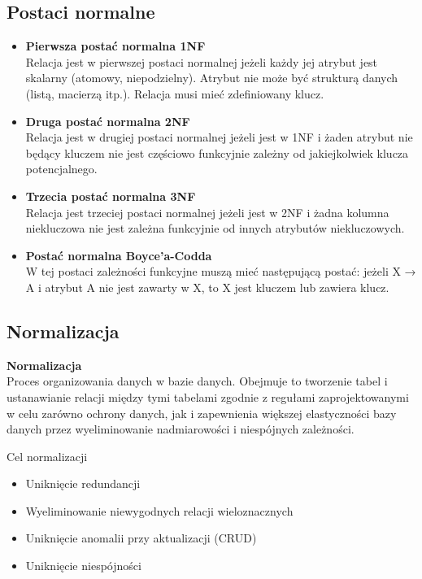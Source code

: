 \documentclass[main.tex]{subfiles}
\begin{document}
    \subsection{Postaci normalne}

    \begin{itemize}
        \item \textbf{Pierwsza postać normalna 1NF}\\
        Relacja jest w pierwszej postaci normalnej jeżeli każdy jej atrybut jest skalarny (atomowy, niepodzielny). Atrybut nie może być strukturą danych (listą, macierzą itp.). Relacja musi mieć zdefiniowany klucz.
        \item \textbf{Druga postać normalna 2NF}\\
        Relacja jest w drugiej postaci normalnej jeżeli jest w 1NF i żaden atrybut nie będący kluczem nie jest częściowo funkcyjnie zależny od jakiejkolwiek klucza potencjalnego.
        \item \textbf{Trzecia postać normalna 3NF}\\
        Relacja jest trzeciej postaci normalnej jeżeli jest w 2NF i żadna kolumna niekluczowa nie jest zależna funkcyjnie od innych atrybutów niekluczowych.
        \item \textbf{Postać normalna Boyce'a-Codda}\\
        W tej postaci zależności funkcyjne muszą mieć następującą postać: jeżeli X → A i atrybut A nie jest zawarty w X, to X jest kluczem lub zawiera klucz.
    \end{itemize}

    \subsection{Normalizacja}
    \begin{definition}
        \textbf{Normalizacja}\\
        Proces organizowania danych w bazie danych. Obejmuje to tworzenie tabel i ustanawianie relacji między tymi tabelami zgodnie z regułami zaprojektowanymi w celu zarówno ochrony danych, jak i zapewnienia większej elastyczności bazy danych przez wyeliminowanie nadmiarowości i niespójnych zależności.
    \end{definition}

    Cel normalizacji
    \begin{itemize}
        \item Uniknięcie redundancji
        \item Wyeliminowanie niewygodnych relacji wieloznacznych
        \item Uniknięcie anomalii przy aktualizacji (CRUD)
        \item Uniknięcie niespójności
    \end{itemize}
\end{document}
